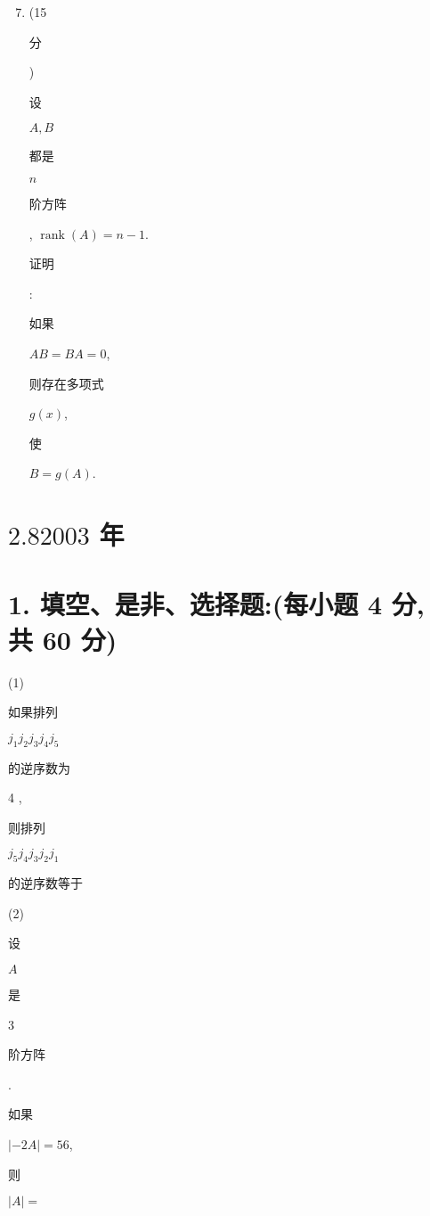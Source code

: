 \documentclass[10pt]{article}
\begin{document}
\begin{enumerate}
  \setcounter{enumi}{6}
  \item (15 \begin{CJK}{UTF8}{mj}分\end{CJK}) \begin{CJK}{UTF8}{mj}设\end{CJK} $A, B$ \begin{CJK}{UTF8}{mj}都是\end{CJK} $n$ \begin{CJK}{UTF8}{mj}阶方阵\end{CJK}, $\operatorname{rank}(A)=n-1$. \begin{CJK}{UTF8}{mj}证明\end{CJK}: \begin{CJK}{UTF8}{mj}如果\end{CJK} $A B=B A=0$, \begin{CJK}{UTF8}{mj}则存在多项式\end{CJK} $g(x)$, \begin{CJK}{UTF8}{mj}使\end{CJK} $B=g(A)$.
\end{enumerate}
\section{$2.82003$ 年}
\section{1. 填空、是非、选择题:(每小题 4 分, 共 60 分)}
(1) \begin{CJK}{UTF8}{mj}如果排列\end{CJK} $j_{1} j_{2} j_{3} j_{4} j_{5}$ \begin{CJK}{UTF8}{mj}的逆序数为\end{CJK} 4 , \begin{CJK}{UTF8}{mj}则排列\end{CJK} $j_{5} j_{4} j_{3} j_{2} j_{1}$ \begin{CJK}{UTF8}{mj}的逆序数等于\end{CJK}

(2) \begin{CJK}{UTF8}{mj}设\end{CJK} $A$ \begin{CJK}{UTF8}{mj}是\end{CJK} 3 \begin{CJK}{UTF8}{mj}阶方阵\end{CJK}. \begin{CJK}{UTF8}{mj}如果\end{CJK} $|-2 A|=56$, \begin{CJK}{UTF8}{mj}则\end{CJK} $|A|=$
\end{document}
